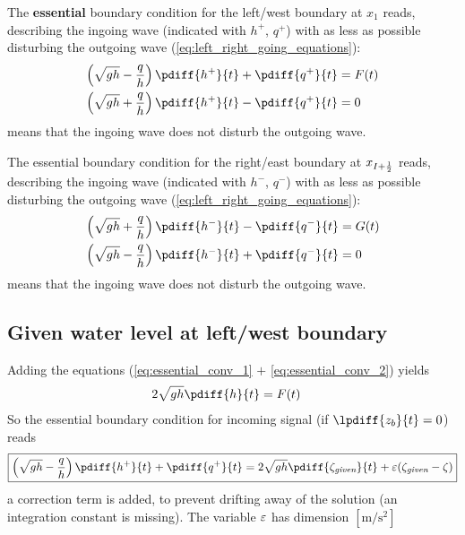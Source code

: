 The \textbf{essential} boundary condition for the left/west boundary at $x_{1}$ reads, describing the ingoing wave (indicated with $h^+$, $q^+$) with as less as possible disturbing the outgoing wave (\autoref{eq:left_right_going_equations}):
\begin{align}
    \left(\sqrt{gh} - \frac{q}{h}\right) \pdiff{h^{+}}{t} + \pdiff{q^{+}}{t} & = F(t)
    \label{eq:essential_conv_1}
    \\
    \left(\sqrt{gh} + \frac{q}{h}\right) \pdiff{h^{+}}{t} - \pdiff{q^{+}}{t} & = 0
    \label{eq:essential_conv_2}
\end{align}
 means that the ingoing wave does not disturb the outgoing wave.

The essential boundary condition for the right/east boundary at $x_{I+\frac{1}{2}}$ reads, describing the ingoing wave (indicated with $h^-$, $q^-$) with as less as possible disturbing the outgoing wave (\autoref{eq:left_right_going_equations}):\begin{align}
    \left(\sqrt{gh} + \frac{q}{h}\right) \pdiff{h^{-}}{t} - \pdiff{q^{-}}{t} & = G(t)
    \label{eq:essential_conv_3}
    \\
    \left(\sqrt{gh} - \frac{q}{h}\right) \pdiff{h^{-}}{t} + \pdiff{q^{-}}{t} & = 0
    \label{eq:essential_conv_4}
\end{align}
 means that the ingoing wave does not disturb the outgoing wave.


%
\subsection*{Given water level at left/west boundary}


Adding the equations (\eqref{eq:essential_conv_1} $+$ \eqref{eq:essential_conv_2}) yields
\begin{align}
    2 \sqrt{gh} \pdiff{h}{t} & = F(t)
\end{align}
%
So the essential boundary condition for incoming signal (if $\lpdiff{z_b}{t} = 0$) reads
\begin{align}
    {\boxed{
        \left(\sqrt{gh} - \frac{q}{h}\right) \pdiff{h^{+}}{t} + \pdiff{q^{+}}{t}  = 2 \sqrt{gh} \pdiff{\zeta_{\textit{given}}}{t}  + \eps(\zeta_{\textit{given}} - \zeta)
        }}\label{eq:essential_bc_zeta}
\end{align}
a correction term is added, to prevent drifting away of the solution (an integration constant is missing).
The variable $\varepsilon$ has dimension $[\si{\metre\per\square\second}]$

